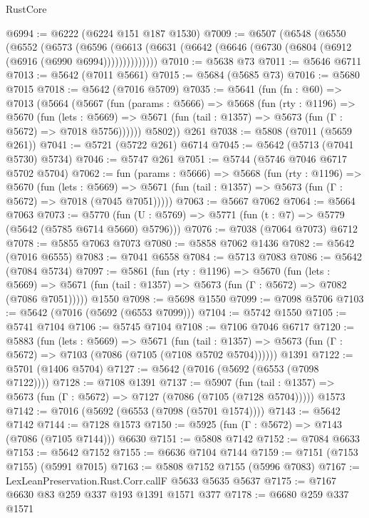 \begin{lexlean}{RustCore}
\begin{coremodule}
@6994 := @6222 (@6224 @151 @187 @1530)
@7009 := @6507
    (@6548
      (@6550
        (@6552
          (@6573
            (@6596
              (@6613 (@6631 (@6642 (@6646 (@6730 (@6804 (@6912 (@6916 (@6990 @6994))))))))))))))
@7010 := @5638 @73
@7011 := @5646 @6711
@7013 := @5642 (@7011 @5661)
@7015 := @5684 (@5685 @73)
@7016 := @5680 @7015
@7018 := @5642 (@7016 @5709)
@7035 := @5641
    (fun (fn : @60) =>
    @7013
      (@5664
        (@5667
          (fun (params : @5666) =>
          @5668
            (fun (rty : @1196) =>
            @5670
              (fun (lets : @5669) =>
              @5671 (fun (tail : @1357) => @5673 (fun (Γ : @5672) => @7018 @5756))))))
        @5802))
    @261
@7038 := @5808 (@7011 (@5659 @261))
@7041 := @5721 (@5722 @261) @6714
@7045 := @5642 (@5713 (@7041 @5730) @5734)
@7046 := @5747 @261
@7051 := @5744 (@5746 @7046 @6717 @5702 @5704)
@7062 := fun (params : @5666) =>
  @5668
    (fun (rty : @1196) =>
    @5670
      (fun (lets : @5669) =>
      @5671 (fun (tail : @1357) => @5673 (fun (Γ : @5672) => @7018 (@7045 @7051)))))
@7063 := @5667 @7062
@7064 := @5664 @7063
@7073 := @5770 (fun (U : @5769) => @5771 (fun (t : @7) => @5779 (@5642 (@5785 @6714 @5660) @5796)))
@7076 := @7038 (@7064 @7073) @6712
@7078 := @5855 @7063 @7073
@7080 := @5858 @7062 @1436
@7082 := @5642 (@7016 @6555)
@7083 := @7041 @6558
@7084 := @5713 @7083
@7086 := @5642 (@7084 @5734)
@7097 := @5861
    (fun (rty : @1196) =>
    @5670
      (fun (lets : @5669) =>
      @5671 (fun (tail : @1357) => @5673 (fun (Γ : @5672) => @7082 (@7086 @7051)))))
    @1550
@7098 := @5698 @1550
@7099 := @7098 @5706
@7103 := @5642 (@7016 (@5692 (@6553 @7099)))
@7104 := @5742 @1550
@7105 := @5741 @7104
@7106 := @5745 @7104
@7108 := @7106 @7046 @6717
@7120 := @5883
    (fun (lets : @5669) =>
    @5671
      (fun (tail : @1357) => @5673 (fun (Γ : @5672) => @7103 (@7086 (@7105 (@7108 @5702 @5704))))))
    @1391
@7122 := @5701 (@1406 @5704)
@7127 := @5642 (@7016 (@5692 (@6553 (@7098 @7122))))
@7128 := @7108 @1391
@7137 := @5907
    (fun (tail : @1357) => @5673 (fun (Γ : @5672) => @7127 (@7086 (@7105 (@7128 @5704)))))
    @1573
@7142 := @7016 (@5692 (@6553 (@7098 (@5701 @1574))))
@7143 := @5642 @7142
@7144 := @7128 @1573
@7150 := @5925 (fun (Γ : @5672) => @7143 (@7086 (@7105 @7144))) @6630
@7151 := @5808 @7142
@7152 := @7084 @6633
@7153 := @5642 @7152
@7155 := @6636 @7104 @7144
@7159 := @7151 (@7153 @7155) (@5991 @7015)
@7163 := @5808 @7152 @7155 (@5996 @7083)
@7167 := LexLeanPreservation.Rust.Corr.callF @5633 @5635 @5637
@7175 := @7167 @6630 @83 @259 @337 @193 @1391 @1571 @377
@7178 := @6680 @259 @337 @1571

\end{coremodule}
\end{lexlean}

